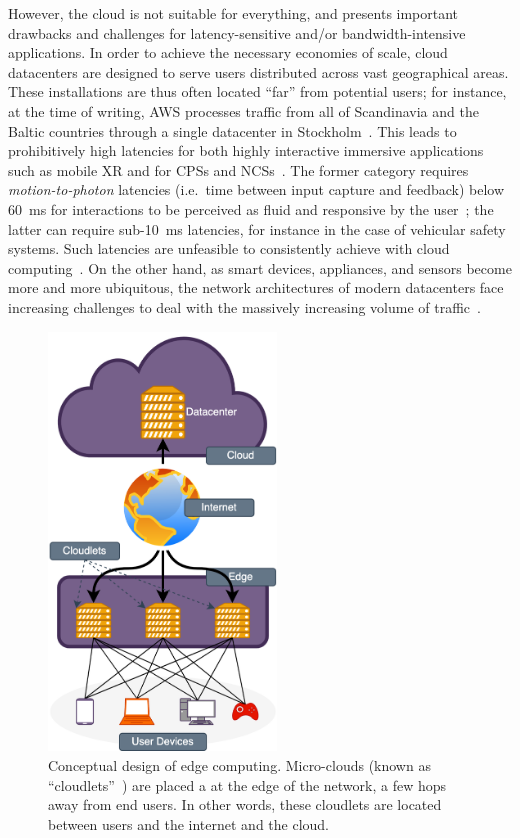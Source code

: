 However, the cloud is not suitable for everything, and presents important drawbacks and challenges for latency-sensitive and/or bandwidth-intensive applications.
In order to achieve the necessary economies of scale, cloud datacenters are designed to serve users distributed across vast geographical areas.
These installations are thus often located ``far'' from potential users;
for instance, at the time of writing, \gls{AWS} processes traffic from all of Scandinavia and the Baltic countries through a single datacenter in Stockholm~\cite{awsregions}.
This leads to prohibitively high latencies for both highly interactive immersive applications such as mobile \gls{XR} and for \glspl{CPS} and \glspl{NCS}~\cite{tolia2006quantifying,lagar2007interactive,satyanarayanan2009case,varghese2016challenges,shi2016promise}.
The former category requires \emph{motion-to-photon} latencies (i.e.\ time between input capture and feedback) below \SI{60}{\milli\second} for interactions to be perceived as fluid and responsive by the user~\cite{chen2017empirical}; the latter can require sub-\SI{10}{\milli\second} latencies, for instance in the case of vehicular safety systems.
Such latencies are unfeasible to consistently achieve with cloud computing~\cite{dang2021cloudy}.
On the other hand, as smart devices, appliances, and sensors become more and more ubiquitous, the network architectures of modern datacenters face increasing challenges to deal with the massively increasing volume of traffic~\cite{shi2016edge,wang2019towards}.

\begin{figure}
    \centering
    \includegraphics[height=30em]{Figs/edgecomputing}
    \caption{%
        Conceptual design of edge computing.
        Micro-clouds (known as ``cloudlets''~\cite{satyanarayanan2009case}) are placed a at the edge of the network, a few hops away from end users.
        In other words, these cloudlets are located between users and the internet and the cloud.
    }\label{fig:edgecomputing}
\end{figure}

